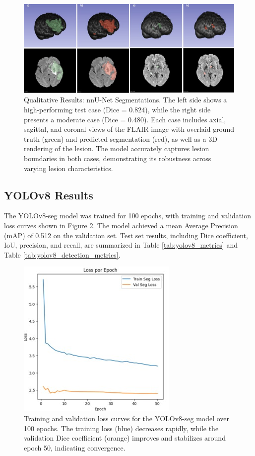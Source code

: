 \documentclass[12pt]{article}
\begin{document}
\begin{figure}[tp]    
    \centering
    \includegraphics[width=\textwidth]{figures/Figure 4.jpg}
    \caption{Qualitative Results: nnU-Net Segmentations. The left side shows a high-performing test case (Dice = 0.824), while the right side presents a moderate case (Dice = 0.480). Each case includes axial, sagittal, and coronal views of the FLAIR image with overlaid ground truth (green) and predicted segmentation (red), as well as a 3D rendering of the lesion. The model accurately captures lesion boundaries in both cases, demonstrating its robustness across varying lesion characteristics.}\label{fig:nnunet_qualitative}
\end{figure}

\subsection{YOLOv8 Results}\label{subsec:yolov8}

The YOLOv8-seg model was trained for 100 epochs, with training and validation loss curves shown in Figure \ref{fig:yolov8_loss_curve}. The model achieved a mean Average Precision (mAP) of 0.512 on the validation set. Test set results, including Dice coefficient, IoU, precision, and recall, are summarized in Table \ref{tab:yolov8_metrics} and Table \ref{tab:yolov8_detection_metrics}.

\begin{figure}[tp]
    \centering
    \includegraphics[width=.7\textwidth]{figures/Figure 5.jpg}
    \caption{Training and validation loss curves for the YOLOv8-seg model over 100 epochs. The training loss (blue) decreases rapidly, while the validation Dice coefficient (orange) improves and stabilizes around epoch 50, indicating convergence.}
    \label{fig:yolov8_loss_curve}
\end{figure}
\end{document}
